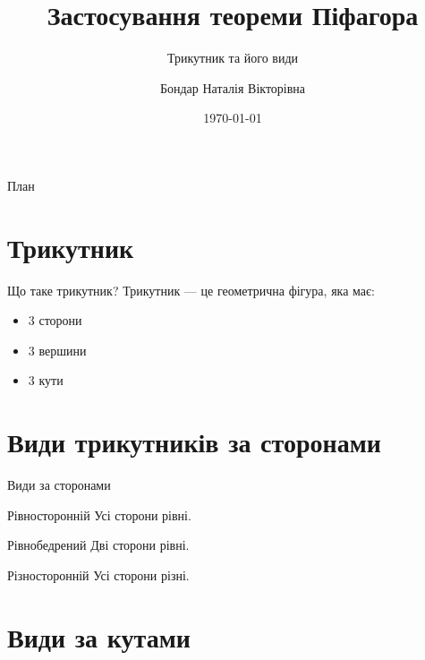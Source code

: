\documentclass{beamer}
\title[Теорема Піфагора]{Застосування теореми Піфагора}
\subtitle{Трикутник та його види}
\author[Прізвище І.П.]{ Бондар Наталія Вікторівна}
\institute[ФМФ]{Факультет математики, фізики та комп'ютерних наук}
\date{\today}
\begin{document}
\begin{frame}
\titlepage
\end{frame}

\begin{frame}{План}
\tableofcontents
\end{frame}

\section{Трикутник}

\begin{frame}{Що таке трикутник?}
Трикутник — це геометрична фігура, яка має:
\begin{itemize}
    \item 3 сторони
    \item 3 вершини
    \item 3 кути
\end{itemize}
\end{frame}

\section{Види трикутників за сторонами}

\begin{frame}{Види за сторонами}

\begin{block}{Рівносторонній}
Усі сторони рівні.
\end{block}

\begin{block}{Рівнобедрений}
Дві сторони рівні.
\end{block}

\begin{block}{Різносторонній}
Усі сторони різні.
\end{block}

\end{frame}

\section{Види за кутами}
\end{document}
